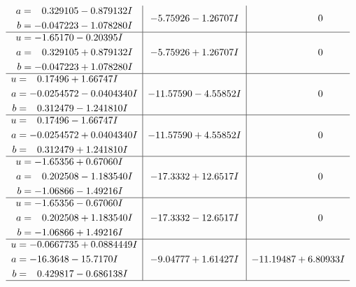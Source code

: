 \documentclass[1p]{elsarticle_modified}
\theoremstyle{definition}
\begin{document}
$$\begin{array}{c|c|c}
\begin{aligned}
a &= \phantom{-}0.329105 - 0.879132 I \\
b &= -0.047223 - 1.078280 I\end{aligned}
 & -5.75926 - 1.26707 I & \phantom{-0.000000 } 0 \\ \hline\begin{aligned}
u &= -1.65170 - 0.20395 I \\
a &= \phantom{-}0.329105 + 0.879132 I \\
b &= -0.047223 + 1.078280 I\end{aligned}
 & -5.75926 + 1.26707 I & \phantom{-0.000000 } 0 \\ \hline\begin{aligned}
u &= \phantom{-}0.17496 + 1.66747 I \\
a &= -0.0254572 - 0.0404340 I \\
b &= \phantom{-}0.312479 - 1.241810 I\end{aligned}
 & -11.57590 - 4.55852 I & \phantom{-0.000000 } 0 \\ \hline\begin{aligned}
u &= \phantom{-}0.17496 - 1.66747 I \\
a &= -0.0254572 + 0.0404340 I \\
b &= \phantom{-}0.312479 + 1.241810 I\end{aligned}
 & -11.57590 + 4.55852 I & \phantom{-0.000000 } 0 \\ \hline\begin{aligned}
u &= -1.65356 + 0.67060 I \\
a &= \phantom{-}0.202508 - 1.183540 I \\
b &= -1.06866 - 1.49216 I\end{aligned}
 & -17.3332 + 12.6517 I & \phantom{-0.000000 } 0 \\ \hline\begin{aligned}
u &= -1.65356 - 0.67060 I \\
a &= \phantom{-}0.202508 + 1.183540 I \\
b &= -1.06866 + 1.49216 I\end{aligned}
 & -17.3332 - 12.6517 I & \phantom{-0.000000 } 0 \\ \hline\begin{aligned}
u &= -0.0667735 + 0.0884449 I \\
a &= -16.3648 - 15.7170 I \\
b &= \phantom{-}0.429817 - 0.686138 I\end{aligned}
 & -9.04777 + 1.61427 I & -11.19487 + 6.80933 I\\
 \hline 
 \end{array}$$\newpage$$\begin{array}{c|c|c}  

\end{array}$$
\end{document}
